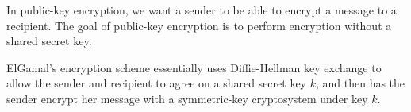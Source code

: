 \documentclass[
  letterpaper,
]{scrbook}
\theoremstyle{definition}
\theoremstyle{plain}
\theoremstyle{plain}
\theoremstyle{remark}
\begin{document}
In public-key encryption, we want a sender to be able to encrypt a
message to a recipient. The goal of public-key encryption is to perform
encryption without a shared secret key.

ElGamal's encryption scheme essentially uses Diffie-Hellman key exchange
to allow the sender and recipient to agree on a shared secret key \(k\),
and then has the sender encrypt her message with a symmetric-key
cryptosystem under key \(k\).

\end{document}
